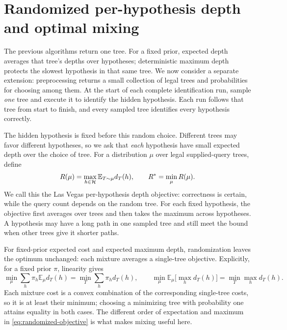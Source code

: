 \section{Randomized per-hypothesis depth and optimal mixing}
\label{sec:randomized-programming}

The previous algorithms return one tree. For a fixed prior, expected
depth averages that tree's depths over hypotheses; deterministic
maximum depth protects the slowest hypothesis in that same tree.
We now consider a separate extension: preprocessing returns a small
collection of legal trees and probabilities for choosing among them.
At the start of each complete identification run, sample \emph{one}
tree and execute it to identify the hidden hypothesis. Each run follows
that tree from start to finish, and every sampled tree identifies every
hypothesis correctly.

The hidden hypothesis is fixed before this random choice. Different
trees may favor different hypotheses, so we ask that \emph{each}
hypothesis have small expected depth over the choice of tree. For a
distribution $\mu$ over legal supplied-query trees, define
\begin{equation}\label{eq:randomized-objective}
 R(\mu)=\max_{h\in\mathcal H}\mathbb E_{T\sim\mu}d_T(h),
 \qquad R^*=\min_\mu R(\mu).
\end{equation}
We call this the Las Vegas per-hypothesis depth objective: correctness
is certain, while the query count depends on the random tree. For each
fixed hypothesis, the objective first averages over trees and then takes
the maximum across hypotheses. A hypothesis may have a long path in one
sampled tree and still meet the bound when other trees give it shorter
paths.

For fixed-prior expected cost and expected maximum depth, randomization
leaves the optimum unchanged: each mixture averages a single-tree
objective.
Explicitly, for a fixed prior $\pi$, linearity gives
\[
 \min_\mu\sum_h\pi_h\mathbb E_\mu d_T(h)
   =\min_T\sum_h\pi_hd_T(h),\qquad
 \min_\mu\mathbb E_\mu\bigl[\max_h d_T(h)\bigr]
   =\min_T\max_h d_T(h).
\]
Each mixture cost is a convex combination of the corresponding
single-tree costs, so it is at least their minimum; choosing a
minimizing tree with probability one attains equality in both cases.
The different order of expectation and maximum in
\eqref{eq:randomized-objective} is what makes mixing useful here.

